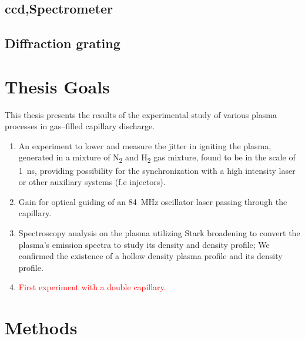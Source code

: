 \documentclass[justified,nofonts,nobib]{tufte-book}
\begin{document}
\section{ccd,Spectrometer}\label{sec:ccd}

\section{Diffraction grating}\label{sec:diffractiongrating}

\chapter{Thesis Goals}\label{chap:goals}
This thesis presents the results of the experimental study of various plasma processes in gas--filled capillary discharge.
\begin{enumerate}
  \item An experiment to lower and measure the jitter in igniting the plasma, generated in a mixture of N\textsubscript{2} and H\textsubscript{2} gas mixture, found to be in the scale of \SI{1}{\ns}, providing possibility for the synchronization with a high intensity laser or other auxiliary systems (f.e injectors).
  \item Gain for optical guiding of an \SI{84}{\MHz} oscillator laser passing through the capillary.
  \item Spectroscopy analysis on the plasma utilizing Stark broadening to convert the plasma's emission spectra to study its density and density profile; We confirmed the existence of a hollow density plasma profile and its density profile.
  \item \textcolor{red}{First experiment with a double capillary.}
\end{enumerate}
	\chapter{Methods}\label{chap:methods}
\end{document}
